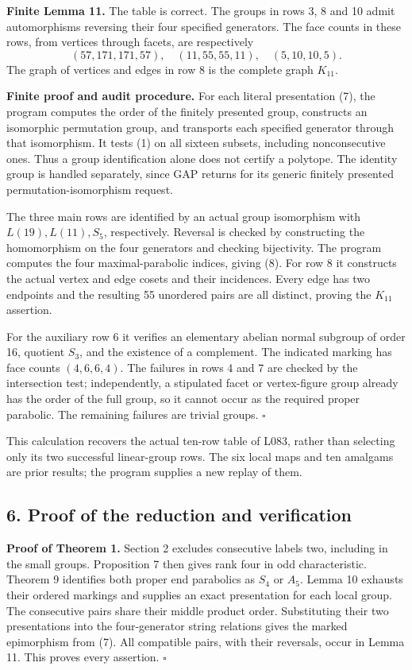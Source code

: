 \documentclass[
  11pt,
  a4paper,
]{article}
\renewcommand{\texttt}[1]{{\ttfamily\seqsplit{#1}}}
\begin{document}
\textbf{Finite Lemma 11.} The table is correct. The groups in rows 3, 8
and 10 admit automorphisms reversing their four specified generators.
The face counts in these rows, from vertices through facets, are
respectively \[
 (57,171,171,57),\quad (11,55,55,11),\quad(5,10,10,5).
 \tag{8}
\] The graph of vertices and edges in row 8 is the complete graph
\(K_{11}\).

\textbf{Finite proof and audit procedure.} For each literal presentation
(7), the program computes the order of the finitely presented group,
constructs an isomorphic permutation group, and transports each
specified generator through that isomorphism. It tests (1) on all
sixteen subsets, including nonconsecutive ones. Thus a group
identification alone does not certify a polytope. The identity group is
handled separately, since GAP returns \texttt{fail} for its generic
finitely presented permutation-isomorphism request.

The three main rows are identified by an actual group isomorphism with
\(L(19),L(11),S_5\), respectively. Reversal is checked by constructing
the homomorphism on the four generators and checking bijectivity. The
program computes the four maximal-parabolic indices, giving (8). For row
8 it constructs the actual vertex and edge cosets and their incidences.
Every edge has two endpoints and the resulting 55 unordered pairs are
all distinct, proving the \(K_{11}\) assertion.

For the auxiliary row 6 it verifies an elementary abelian normal
subgroup of order 16, quotient \(S_3\), and the existence of a
complement. The indicated marking has face counts \((4,6,6,4)\). The
failures in rows 4 and 7 are checked by the intersection test;
independently, a stipulated facet or vertex-figure group already has the
order of the full group, so it cannot occur as the required proper
parabolic. The remaining failures are trivial groups. \(\square\)

This calculation recovers the actual ten-row table of L083, rather than
selecting only its two successful linear-group rows. The six local maps
and ten amalgams are prior results; the program supplies a new replay of
them.

\subsection{6. Proof of the reduction and
verification}\label{proof-of-the-reduction-and-verification}

\textbf{Proof of Theorem 1.} Section 2 excludes consecutive labels two,
including in the small groups. Proposition 7 then gives rank four in odd
characteristic. Theorem 9 identifies both proper end parabolics as
\(S_4\) or \(A_5\). Lemma 10 exhausts their ordered markings and
supplies an exact presentation for each local group. The consecutive
pairs share their middle product order. Substituting their two
presentations into the four-generator string relations gives the marked
epimorphism from (7). All compatible pairs, with their reversals, occur
in Lemma 11. This proves every assertion. \(\square\)
\end{document}
